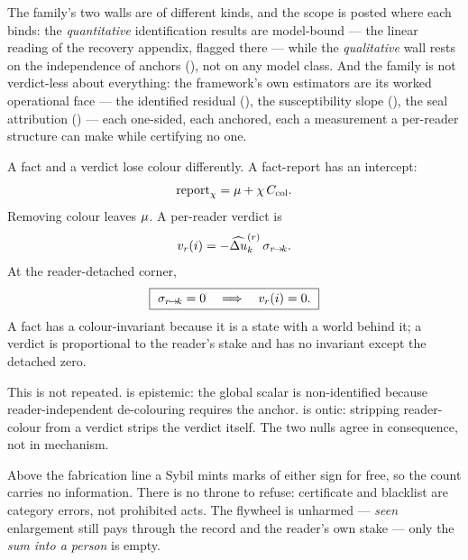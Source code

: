 \documentclass[../main]{subfiles}
\begin{document}
\begin{remark}
  The family's two walls are of different kinds, and the scope is posted where each
  binds: the \emph{quantitative} identification results are model-bound --- the linear
  reading of the recovery appendix, flagged there --- while the \emph{qualitative} wall
  rests on the independence of anchors (), not on any model class. And
  the family is not verdict-less about everything: the framework's own estimators are
  its worked operational face --- the identified residual (), the
  susceptibility slope (), the seal attribution
  () --- each one-sided, each anchored, each a measurement a
  per-reader structure can make while certifying no one.
\end{remark}

\begin{theorem}
  A fact and a verdict lose colour differently. A fact-report has an intercept:
  \begin{equation}
    \operatorname{report}\sb{ \ensuremath{\chi} }
      =\mu+\chi\,C\sb{\mathrm{col}}.
    \label{eq:pr:fact-intercept}
  \end{equation}
  Removing colour leaves $\mu$. A per-reader verdict is
  \begin{equation}
    v\sb{r}(i)
      =
      -\widehat{\Delta u}\sb{k}\sp{(r)}\,\sigma\sb{ r\!\to\!k }.
    \label{eq:pr:verdict-colour}
  \end{equation}
  At the reader-detached corner,
  \begin{equation}
    \boxed{\ \lean{r}{k}=0\quad\Longrightarrow\quad \readerverdict{r}{i}=0.\ }
    \label{eq:pr:colour-detached}
  \end{equation}
  A fact has a colour-invariant because it is a state with a world behind it; a verdict is
  proportional to the reader's stake and has no invariant except the detached zero.
\end{theorem}

This is not  repeated.  is epistemic: the global scalar is
non-identified because reader-independent de-colouring requires the anchor. 
is ontic: stripping reader-colour from a verdict strips the verdict itself. The two nulls
agree in consequence, not in mechanism.

Above the fabrication line a Sybil mints marks of either sign for free, so the count carries
no information. There is no throne to refuse: certificate and blacklist are category errors,
not prohibited acts. The flywheel is unharmed --- \emph{seen} enlargement still pays through
the record and the reader's own stake --- only the \emph{sum into a person} is empty.
\end{document}
